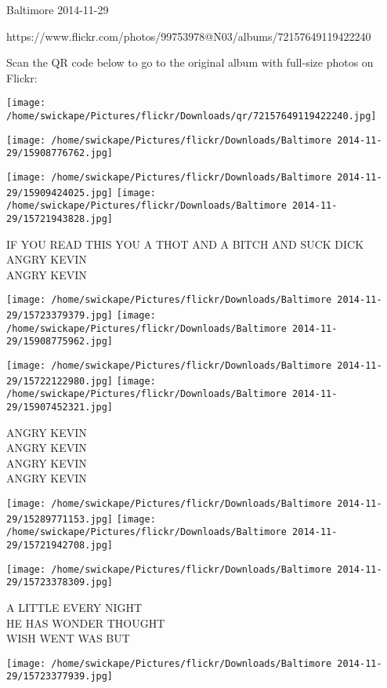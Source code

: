 \documentclass[10pt,letterpaper]{article}
\begin{document}
Baltimore 2014-11-29

https://www.flickr.com/photos/99753978@N03/albums/72157649119422240

Scan the QR code below to go to the original album with full-size photos on Flickr:

\texttt{[image: /home/swickape/Pictures/flickr/Downloads/qr/72157649119422240.jpg]}
\pagebreak

\texttt{[image: /home/swickape/Pictures/flickr/Downloads/Baltimore 2014-11-29/15908776762.jpg]}

\vspace{0.25in}
\texttt{[image: /home/swickape/Pictures/flickr/Downloads/Baltimore 2014-11-29/15909424025.jpg]}
\texttt{[image: /home/swickape/Pictures/flickr/Downloads/Baltimore 2014-11-29/15721943828.jpg]}

IF YOU READ THIS YOU A THOT AND A BITCH AND SUCK DICK\\
ANGRY KEVIN\\
ANGRY KEVIN
\pagebreak

\texttt{[image: /home/swickape/Pictures/flickr/Downloads/Baltimore 2014-11-29/15723379379.jpg]}
\texttt{[image: /home/swickape/Pictures/flickr/Downloads/Baltimore 2014-11-29/15908775962.jpg]}

\texttt{[image: /home/swickape/Pictures/flickr/Downloads/Baltimore 2014-11-29/15722122980.jpg]}
\texttt{[image: /home/swickape/Pictures/flickr/Downloads/Baltimore 2014-11-29/15907452321.jpg]}

ANGRY KEVIN\\
ANGRY KEVIN\\
ANGRY KEVIN\\
ANGRY KEVIN
\pagebreak

\texttt{[image: /home/swickape/Pictures/flickr/Downloads/Baltimore 2014-11-29/15289771153.jpg]}
\texttt{[image: /home/swickape/Pictures/flickr/Downloads/Baltimore 2014-11-29/15721942708.jpg]}

\vspace{0.25in}
\texttt{[image: /home/swickape/Pictures/flickr/Downloads/Baltimore 2014-11-29/15723378309.jpg]}

A LITTLE EVERY NIGHT\\
HE HAS WONDER THOUGHT\\
WISH WENT WAS BUT
\pagebreak

\texttt{[image: /home/swickape/Pictures/flickr/Downloads/Baltimore 2014-11-29/15723377939.jpg]}
\end{document}
